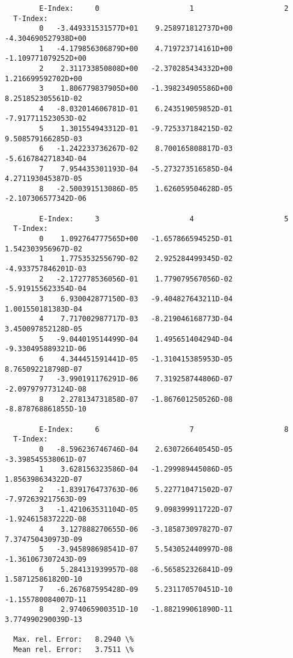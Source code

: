 \documentclass[12pt,dvipdfmx]{article}
\begin{document}
{\begin{small}\begin{verbatim}
        E-Index:     0                     1                     2
  T-Index:
        0   -3.449331531577D+01    9.258971812737D+00   -4.304690527938D+00
        1   -4.179856306879D+00    4.719723714161D+00   -1.109771079252D+00
        2    2.311733850808D+00   -2.370285434332D+00    1.216699592702D+00
        3    1.806779837905D+00   -1.398234905586D+00    8.251852305561D-02
        4   -8.032014606781D-01    6.243519059852D-01   -7.917711523053D-02
        5    1.301554943312D-01   -9.725337184215D-02    9.508579166285D-03
        6   -1.242233736267D-02    8.700165808817D-03   -5.616784271834D-04
        7    7.954435301193D-04   -5.273273516585D-04    4.271193045387D-05
        8   -2.500391513086D-05    1.626059504628D-05   -2.107306577342D-06

        E-Index:     3                     4                     5
  T-Index:
        0    1.092764777565D+00   -1.657866594525D-01    1.542303956967D-02
        1    1.775353255679D-02    2.925284499345D-02   -4.933757846201D-03
        2   -2.172778536056D-01    1.779079567056D-02   -5.919155623354D-04
        3    6.930042877150D-03   -9.404827643211D-04    1.001550181383D-04
        4    7.717002987717D-03   -8.219046168773D-04    3.450097852128D-05
        5   -9.044019514499D-04    1.495651404294D-04   -9.330495889321D-06
        6    4.344451591441D-05   -1.310415385953D-05    8.765092218798D-07
        7   -3.990191176291D-06    7.319258744806D-07   -2.097979773124D-08
        8    2.278134731858D-07   -1.867601250526D-08   -8.878768861855D-10

        E-Index:     6                     7                     8
  T-Index:
        0   -8.596236746746D-04    2.630726640545D-05   -3.398545538061D-07
        1    3.628156323586D-04   -1.299989445086D-05    1.856398634322D-07
        2   -1.839176473763D-06    5.227710471502D-07   -7.972639217563D-09
        3   -1.421063531104D-05    9.098399911722D-07   -1.924615837222D-08
        4    3.127888270655D-06   -3.185873097827D-07    7.374750430973D-09
        5   -3.945898698541D-07    5.543052440997D-08   -1.361067307243D-09
        6    5.284131939957D-08   -6.565852326841D-09    1.587125861820D-10
        7   -6.267687595428D-09    5.231170570451D-10   -1.155780084007D-11
        8    2.974065900351D-10   -1.882199061890D-11    3.774990290039D-13

  Max. rel. Error:   8.2940 \%
  Mean rel. Error:   3.7511 \%




\end{verbatim}
\end{small}}
\end{document}
